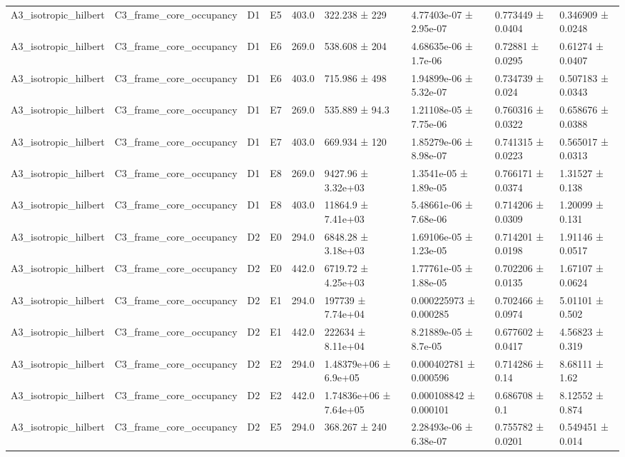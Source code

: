 \begin{table}
\begin{tabular}{lllllllll}
A3\_isotropic\_hilbert & C3\_frame\_core\_occupancy & D1 & E5 & 403.0 & 322.238 ± 229 & 4.77403e-07 ± 2.95e-07 & 0.773449 ± 0.0404 & 0.346909 ± 0.0248 \\
A3\_isotropic\_hilbert & C3\_frame\_core\_occupancy & D1 & E6 & 269.0 & 538.608 ± 204 & 4.68635e-06 ± 1.7e-06 & 0.72881 ± 0.0295 & 0.61274 ± 0.0407 \\
A3\_isotropic\_hilbert & C3\_frame\_core\_occupancy & D1 & E6 & 403.0 & 715.986 ± 498 & 1.94899e-06 ± 5.32e-07 & 0.734739 ± 0.024 & 0.507183 ± 0.0343 \\
A3\_isotropic\_hilbert & C3\_frame\_core\_occupancy & D1 & E7 & 269.0 & 535.889 ± 94.3 & 1.21108e-05 ± 7.75e-06 & 0.760316 ± 0.0322 & 0.658676 ± 0.0388 \\
A3\_isotropic\_hilbert & C3\_frame\_core\_occupancy & D1 & E7 & 403.0 & 669.934 ± 120 & 1.85279e-06 ± 8.98e-07 & 0.741315 ± 0.0223 & 0.565017 ± 0.0313 \\
A3\_isotropic\_hilbert & C3\_frame\_core\_occupancy & D1 & E8 & 269.0 & 9427.96 ± 3.32e+03 & 1.3541e-05 ± 1.89e-05 & 0.766171 ± 0.0374 & 1.31527 ± 0.138 \\
A3\_isotropic\_hilbert & C3\_frame\_core\_occupancy & D1 & E8 & 403.0 & 11864.9 ± 7.41e+03 & 5.48661e-06 ± 7.68e-06 & 0.714206 ± 0.0309 & 1.20099 ± 0.131 \\
A3\_isotropic\_hilbert & C3\_frame\_core\_occupancy & D2 & E0 & 294.0 & 6848.28 ± 3.18e+03 & 1.69106e-05 ± 1.23e-05 & 0.714201 ± 0.0198 & 1.91146 ± 0.0517 \\
A3\_isotropic\_hilbert & C3\_frame\_core\_occupancy & D2 & E0 & 442.0 & 6719.72 ± 4.25e+03 & 1.77761e-05 ± 1.88e-05 & 0.702206 ± 0.0135 & 1.67107 ± 0.0624 \\
A3\_isotropic\_hilbert & C3\_frame\_core\_occupancy & D2 & E1 & 294.0 & 197739 ± 7.74e+04 & 0.000225973 ± 0.000285 & 0.702466 ± 0.0974 & 5.01101 ± 0.502 \\
A3\_isotropic\_hilbert & C3\_frame\_core\_occupancy & D2 & E1 & 442.0 & 222634 ± 8.11e+04 & 8.21889e-05 ± 8.7e-05 & 0.677602 ± 0.0417 & 4.56823 ± 0.319 \\
A3\_isotropic\_hilbert & C3\_frame\_core\_occupancy & D2 & E2 & 294.0 & 1.48379e+06 ± 6.9e+05 & 0.000402781 ± 0.000596 & 0.714286 ± 0.14 & 8.68111 ± 1.62 \\
A3\_isotropic\_hilbert & C3\_frame\_core\_occupancy & D2 & E2 & 442.0 & 1.74836e+06 ± 7.64e+05 & 0.000108842 ± 0.000101 & 0.686708 ± 0.1 & 8.12552 ± 0.874 \\
A3\_isotropic\_hilbert & C3\_frame\_core\_occupancy & D2 & E5 & 294.0 & 368.267 ± 240 & 2.28493e-06 ± 6.38e-07 & 0.755782 ± 0.0201 & 0.549451 ± 0.014 \\

\end{tabular}
\end{table}
